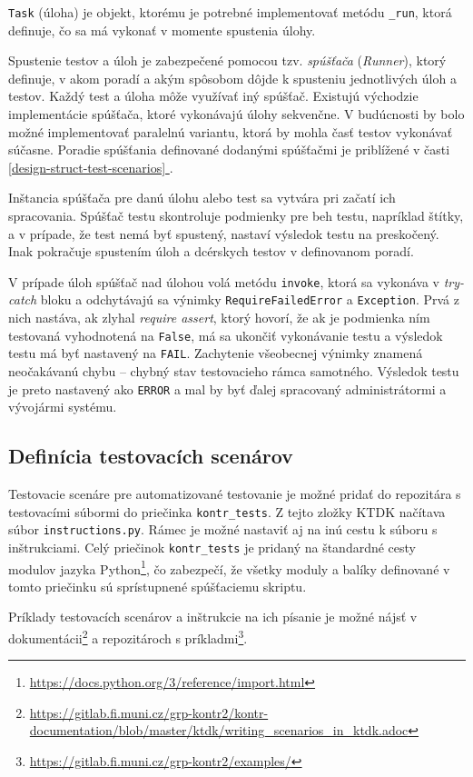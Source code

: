 \documentclass[
  digital, %
  oneside, %
  table,   %
  lof,     %
  lot,   %
]{fithesis3}
\newcommand*{\fullref}[1]{\hyperref[{#1}]{\ref*{#1} \nameref*{#1}}}
\begin{document}
\texttt{Task} (úloha) je objekt, ktorému je potrebné implementovať metódu \texttt{\_run}, ktorá definuje, čo sa má vykonať v momente spustenia úlohy. 

Spustenie testov a úloh je zabezpečené pomocou tzv. \emph{spúšťača} (\emph{Runner}), ktorý definuje, v akom poradí a akým spôsobom dôjde k spusteniu jednotlivých úloh a testov. Každý test a úloha môže využívať iný spúšťač. Existujú východzie implementácie spúšťača, ktoré vykonávajú úlohy sekvenčne. V budúcnosti by bolo možné implementovať paralelnú variantu, ktorá by mohla časť testov vykonávať súčasne. Poradie spúšťania definované dodanými spúšťačmi je priblížené v časti \fullref{design-struct-test-scenarios}.

Inštancia spúšťača pre danú úlohu alebo test sa vytvára pri začatí ich spracovania. Spúšťač testu skontroluje podmienky pre beh testu, napríklad štítky, a v prípade, že test nemá byť spustený, nastaví výsledok testu na preskočený. Inak pokračuje spustením úloh a dcérskych testov v definovanom poradí.

V prípade úloh spúšťač nad úlohou volá metódu \texttt{invoke}, ktorá sa vykonáva v \emph{try-catch} bloku a odchytávajú sa výnimky \texttt{RequireFailedError} a \texttt{Exception}. Prvá z nich nastáva, ak zlyhal \emph{require assert}, ktorý hovorí, že ak je podmienka ním testovaná vyhodnotená na \texttt{False}, má sa ukončiť vykonávanie testu a výsledok testu má byť nastavený na \texttt{FAIL}. Zachytenie všeobecnej výnimky znamená neočakávanú chybu -- chybný stav testovacieho rámca samotného. Výsledok testu je preto nastavený ako \texttt{ERROR} a mal by byť ďalej spracovaný administrátormi a vývojármi systému.

\subsection{Definícia testovacích scenárov}

Testovacie scenáre pre automatizované testovanie je možné pridať do repozitára s testovacími súbormi do priečinka \texttt{kontr\_tests}. Z tejto zložky KTDK načítava súbor \texttt{instructions.py}. Rámec je možné nastaviť aj na inú cestu k súboru s inštrukciami. Celý priečinok \texttt{kontr\_tests} je pridaný na štandardné cesty modulov jazyka Python\footnote{\url{https://docs.python.org/3/reference/import.html}}, čo zabezpečí, že všetky moduly a balíky definované v tomto priečinku sú sprístupnené spúšťaciemu skriptu.

Príklady testovacích scenárov a inštrukcie na ich písanie je možné nájsť v dokumentácii\footnote{\url{https://gitlab.fi.muni.cz/grp-kontr2/kontr-documentation/blob/master/ktdk/writing_scenarios_in_ktdk.adoc}} a repozitároch s príkladmi\footnote{\url{https://gitlab.fi.muni.cz/grp-kontr2/examples/}}. 
\end{document}
